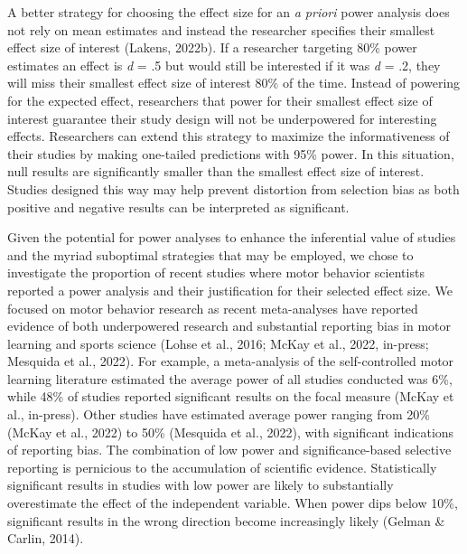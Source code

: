 \documentclass[
  man, donotrepeattitle,mask,floatsintext]{apa7}
\begin{document}
A better strategy for choosing the effect size for an \emph{a priori} power analysis does not rely on mean estimates and instead the researcher specifies their smallest effect size of interest (Lakens, 2022b). If a researcher targeting 80\% power estimates an effect is \emph{d} = .5 but would still be interested if it was \emph{d} = .2, they will miss their smallest effect size of interest 80\% of the time. Instead of powering for the expected effect, researchers that power for their smallest effect size of interest guarantee their study design will not be underpowered for interesting effects. Researchers can extend this strategy to maximize the informativeness of their studies by making one-tailed predictions with 95\% power. In this situation, null results are significantly smaller than the smallest effect size of interest. Studies designed this way may help prevent distortion from selection bias as both positive and negative results can be interpreted as significant.

Given the potential for power analyses to enhance the inferential value of studies and the myriad suboptimal strategies that may be employed, we chose to investigate the proportion of recent studies where motor behavior scientists reported a power analysis and their justification for their selected effect size. We focused on motor behavior research as recent meta-analyses have reported evidence of both underpowered research and substantial reporting bias in motor learning and sports science (Lohse et al., 2016; McKay et al., 2022, in-press; Mesquida et al., 2022). For example, a meta-analysis of the self-controlled motor learning literature estimated the average power of all studies conducted was 6\%, while 48\% of studies reported significant results on the focal measure (McKay et al., in-press). Other studies have estimated average power ranging from 20\% (McKay et al., 2022) to 50\% (Mesquida et al., 2022), with significant indications of reporting bias. The combination of low power and significance-based selective reporting is pernicious to the accumulation of scientific evidence. Statistically significant results in studies with low power are likely to substantially overestimate the effect of the independent variable. When power dips below 10\%, significant results in the wrong direction become increasingly likely (Gelman \& Carlin, 2014).
\end{document}
